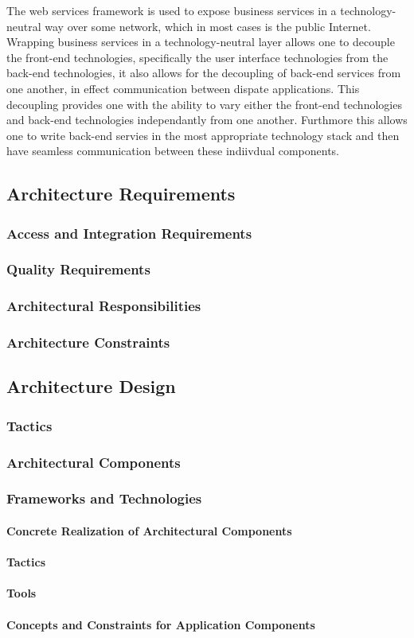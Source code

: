 The web services framework is used to expose business services in a
technology-neutral way over some network, which in most cases is the public
Internet.  Wrapping business services in a technology-neutral layer allows
one to decouple the front-end technologies, specifically the user interface
technologies from the back-end technologies, it also allows for the decoupling
of back-end services from one another, in effect communication between dispate
applications.  This decoupling provides one with the ability to vary either the
front-end technologies and back-end technologies independantly from one
another.  Furthmore this allows one to write back-end servies in the most
appropriate technology stack and then have seamless communication between these
indiivdual components.

\subsection{Architecture Requirements}
\subsubsection{Access and Integration Requirements}
\subsubsection{Quality Requirements}
\subsubsection{Architectural Responsibilities}
\subsubsection{Architecture Constraints}
\subsection{Architecture Design}
\subsubsection{Tactics}
\subsubsection{Architectural Components}
\subsubsection{Frameworks and Technologies}
\paragraph{Concrete Realization of Architectural Components}
\paragraph{Tactics}
\paragraph{Tools}
\paragraph{Concepts and Constraints for Application Components}